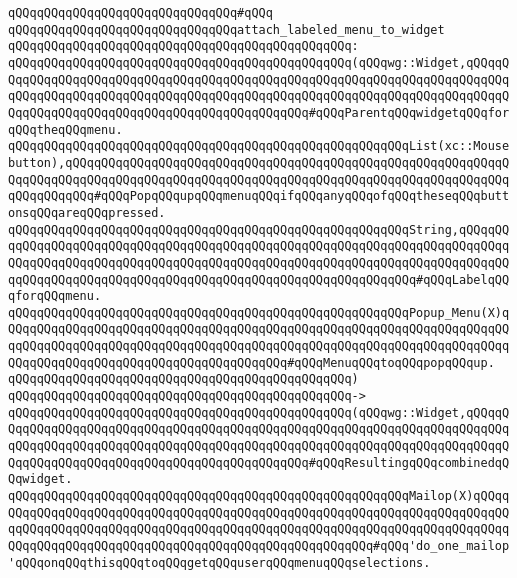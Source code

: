 \verb|qQQqqQQqqQQqqQQqqQQqqQQqqQQqqQQq#qQQq|\newline
\verb|qQQqqQQqqQQqqQQqqQQqqQQqqQQqqQQqattach_labeled_menu_to_widget|\newline
\verb|qQQqqQQqqQQqqQQqqQQqqQQqqQQqqQQqqQQqqQQqqQQqqQQq:|\newline
\verb|qQQqqQQqqQQqqQQqqQQqqQQqqQQqqQQqqQQqqQQqqQQqqQQq(qQQqwg::Widget,qQQqqQQqqQQqqQQqqQQqqQQqqQQqqQQqqQQqqQQqqQQqqQQqqQQqqQQqqQQqqQQqqQQqqQQqqQQqqQQqqQQqqQQqqQQqqQQqqQQqqQQqqQQqqQQqqQQqqQQqqQQqqQQqqQQqqQQqqQQqqQQqqQQqqQQqqQQqqQQqqQQqqQQqqQQqqQQqqQQqqQQqqQQq#qQQqParentqQQqwidgetqQQqforqQQqtheqQQqmenu.|\newline
\verb|qQQqqQQqqQQqqQQqqQQqqQQqqQQqqQQqqQQqqQQqqQQqqQQqqQQqqQQqList(xc::Mousebutton),qQQqqQQqqQQqqQQqqQQqqQQqqQQqqQQqqQQqqQQqqQQqqQQqqQQqqQQqqQQqqQQqqQQqqQQqqQQqqQQqqQQqqQQqqQQqqQQqqQQqqQQqqQQqqQQqqQQqqQQqqQQqqQQqqQQqqQQqqQQqqQQq#qQQqPopqQQqupqQQqmenuqQQqifqQQqanyqQQqofqQQqtheseqQQqbuttonsqQQqareqQQqpressed.|\newline
\verb|qQQqqQQqqQQqqQQqqQQqqQQqqQQqqQQqqQQqqQQqqQQqqQQqqQQqqQQqString,qQQqqQQqqQQqqQQqqQQqqQQqqQQqqQQqqQQqqQQqqQQqqQQqqQQqqQQqqQQqqQQqqQQqqQQqqQQqqQQqqQQqqQQqqQQqqQQqqQQqqQQqqQQqqQQqqQQqqQQqqQQqqQQqqQQqqQQqqQQqqQQqqQQqqQQqqQQqqQQqqQQqqQQqqQQqqQQqqQQqqQQqqQQqqQQqqQQqqQQqqQQq#qQQqLabelqQQqforqQQqmenu.|\newline
\verb|qQQqqQQqqQQqqQQqqQQqqQQqqQQqqQQqqQQqqQQqqQQqqQQqqQQqqQQqPopup_Menu(X)qQQqqQQqqQQqqQQqqQQqqQQqqQQqqQQqqQQqqQQqqQQqqQQqqQQqqQQqqQQqqQQqqQQqqQQqqQQqqQQqqQQqqQQqqQQqqQQqqQQqqQQqqQQqqQQqqQQqqQQqqQQqqQQqqQQqqQQqqQQqqQQqqQQqqQQqqQQqqQQqqQQqqQQqqQQqqQQqqQQq#qQQqMenuqQQqtoqQQqpopqQQqup.|\newline
\verb|qQQqqQQqqQQqqQQqqQQqqQQqqQQqqQQqqQQqqQQqqQQqqQQq)|\newline
\verb|qQQqqQQqqQQqqQQqqQQqqQQqqQQqqQQqqQQqqQQqqQQqqQQq->|\newline
\verb|qQQqqQQqqQQqqQQqqQQqqQQqqQQqqQQqqQQqqQQqqQQqqQQq(qQQqwg::Widget,qQQqqQQqqQQqqQQqqQQqqQQqqQQqqQQqqQQqqQQqqQQqqQQqqQQqqQQqqQQqqQQqqQQqqQQqqQQqqQQqqQQqqQQqqQQqqQQqqQQqqQQqqQQqqQQqqQQqqQQqqQQqqQQqqQQqqQQqqQQqqQQqqQQqqQQqqQQqqQQqqQQqqQQqqQQqqQQqqQQqqQQqqQQq#qQQqResultingqQQqcombinedqQQqwidget.|\newline
\verb|qQQqqQQqqQQqqQQqqQQqqQQqqQQqqQQqqQQqqQQqqQQqqQQqqQQqqQQqMailop(X)qQQqqQQqqQQqqQQqqQQqqQQqqQQqqQQqqQQqqQQqqQQqqQQqqQQqqQQqqQQqqQQqqQQqqQQqqQQqqQQqqQQqqQQqqQQqqQQqqQQqqQQqqQQqqQQqqQQqqQQqqQQqqQQqqQQqqQQqqQQqqQQqqQQqqQQqqQQqqQQqqQQqqQQqqQQqqQQqqQQqqQQqqQQqqQQqqQQq#qQQq'do_one_mailop'qQQqonqQQqthisqQQqtoqQQqgetqQQquserqQQqmenuqQQqselections.|\newline
